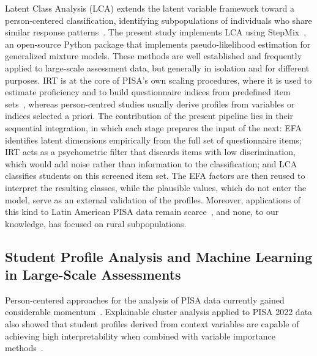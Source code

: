 \documentclass[runningheads]{llncs}
\begin{document}
Latent Class Analysis (LCA) extends the latent variable
framework toward a person-centered classification, identifying
subpopulations of individuals who share similar response
patterns~\cite{collins2010latent}. The present study implements
LCA using StepMix~\cite{morin2025stepmix}, an open-source Python
package that implements pseudo-likelihood estimation for
generalized mixture models. These methods are well established
and frequently applied to large-scale assessment data, but
generally in isolation and for different purposes. IRT is at the
core of PISA's own scaling procedures, where it is used to
estimate proficiency and to build questionnaire indices from
predefined item sets~\cite{oecd2024technical}, whereas
person-centred studies usually derive profiles from variables or
indices selected a priori. The contribution of the present
pipeline lies in their sequential integration, in which each
stage prepares the input of the next: EFA identifies latent
dimensions empirically from the full set of questionnaire items;
IRT acts as a psychometric filter that discards items with low
discrimination, which would add noise rather than information to
the classification; and LCA classifies students on this screened
item set. The EFA factors are then reused to interpret the
resulting classes, while the plausible values, which do not
enter the model, serve as an external validation of the
profiles. Moreover, applications of this kind to Latin American
PISA data remain scarce~\cite{delprato2025resilience}, and none,
to our knowledge, has focused on rural subpopulations.

\subsection{Student Profile Analysis and Machine Learning in
Large-Scale Assessments}

Person-centered approaches for the analysis of PISA data
currently gained considerable momentum~\cite{repo2025wellbeing}.
Explainable cluster analysis applied to PISA 2022 data also
showed that student profiles derived from context variables are
capable of achieving high interpretability when combined with
variable importance methods~\cite{alvarezgarcia2024profiles}.
\end{document}
